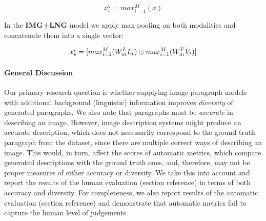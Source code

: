\documentclass[11pt,a4paper]{article}
\begin{document}
\begin{equation}
  x^\varsigma_s = max_{i=1}^M(x)
  \label{eqn:maxpool}
\end{equation}

\noindent In the \textbf{IMG+LNG} model we apply max-pooling on both modalities and concatenate them into a single vector:

\begin{equation}
  x^\varsigma_s = [max_{i=1}^M(W_{m}\sp{L} L_t) \oplus max_{i=1}^M(W_{m}\sp{V} V_t)]
  \label{eqn:maxpool}
\end{equation}



\iffalse
\paragraph{General Discussion}
Our primary research question is whether supplying image paragraph models with additional background (linguistic) information improves \textit{diversity} of generated paragraphs.
We also note that paragraphs must be \textit{accurate} in describing an image.
However, image description systems might produce an accurate description, which does not necessarily correspond to the ground truth paragraph from the dataset, since there are multiple correct ways of describing an image.
This would, in turn, affect the scores of automatic metrics, which compare generated descriptions with the ground truth ones, and, therefore, may not be proper measures of either accuracy or diversity.
We take this into account and report the results of the human evaluation (section reference) in terms of both accuracy and diversity.
For completeness, we also report results of the automatic evaluation (section reference) and demonstrate that automatic metrics fail to capture the human level of judgements.
\end{document}
